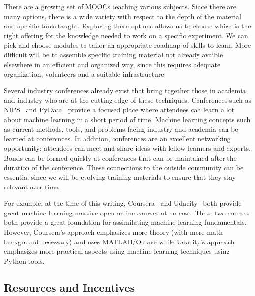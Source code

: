 \documentclass[12pt,a4paper]{article}
\begin{document}
There are a growing set of MOOCs teaching various subjects. Since there are many
options, there is a wide variety with respect to the depth of the material and
specific tools taught. Exploring these options allows us to choose which is the
right offering for the knowledge needed to work on a specific experiment. We
can pick and choose modules to tailor an appropriate roadmap of skills to learn.
More difficult will be to assemble specific training material not already
avaible elsewhere in an efficient and organized way, since this requires
adequate organization, volunteers and a suitable infrastructure.

Several industry conferences already exist that bring together those in academia
and industry who are at the cutting edge of these techniques. Conferences such
as NIPS~\cite{NIPS} and
PyData~\cite{PyData} provide a focused place where
attendees can learn a lot about machine learning in a short period of time.
Machine learning concepts such as current methods, tools, and problems facing
industry and academia can be learned at conferences. In addition, conferences
are an excellent networking opportunity; attendees can meet and share ideas with
fellow learners and experts. Bonds can be formed quickly at conferences that can
be maintained after the duration of the conference. These connections to the
outside community can be essential since we will be evolving training materials
to ensure that they stay relevant over time.

For example, at the time of this writing,
Coursera~\cite{Coursera} and
Udacity~\cite{Udacity}
both provide great machine learning massive open online courses at no cost.
These two courses both provide a great foundation for assimilating machine learning
fundamentals. However, Coursera's approach emphasizes more theory (with more
math background necessary) and uses MATLAB/Octave while Udacity's approach
emphasizes more practical aspects using machine learning techniques
using Python tools.

\subsection{Resources and Incentives}
\end{document}
